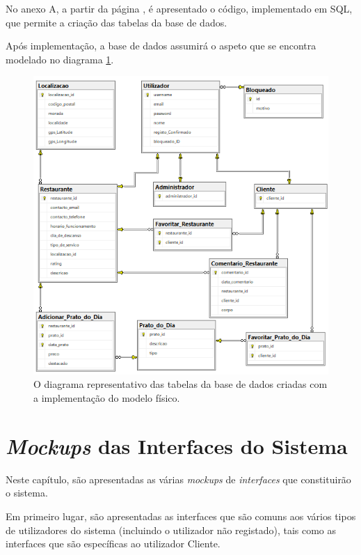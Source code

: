 \documentclass[a4paper,12pt]{report}
\begin{document}
	No anexo A, a partir da página \pageref{anexoA}, é apresentado o código, implementado em SQL, que permite a criação das tabelas da base de dados. 
	
	Após implementação, a base de dados assumirá o aspeto que se encontra modelado no diagrama \ref{fig:diagramaModeloFisicoSQL}.


\begin{figure}[H]
	\begin{center}
	\includegraphics[scale=0.85]{diagramaModeloFisicoSQL}	
	\end{center}
	\medskip
	\caption{O diagrama representativo das tabelas da base de dados criadas com a implementação do modelo físico.}
	\label{fig:diagramaModeloFisicoSQL}	
	\end{figure}




\chapter{\textit{Mockups} das Interfaces do Sistema}	

	Neste capítulo, são apresentadas as várias \textit{mockups} de \textit{interfaces} que constituirão o sistema.
	
	Em primeiro lugar, são apresentadas as interfaces que são comuns aos vários tipos de utilizadores do sistema (incluindo o utilizador não registado), tais como as interfaces que são específicas ao utilizador Cliente.
	
\end{document}
